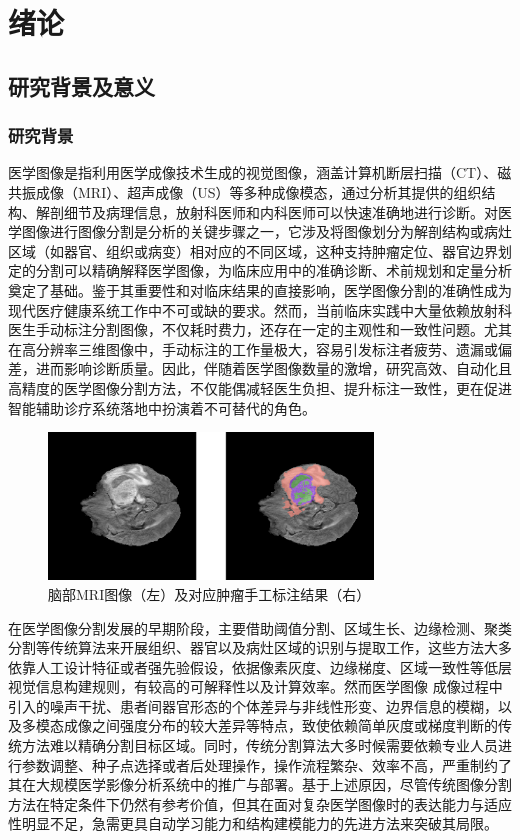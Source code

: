 \section{绪论}

\subsection{研究背景及意义}
\subsubsection{研究背景}

医学图像是指利用医学成像技术生成的视觉图像，涵盖计算机断层扫描（CT）、磁共振成像（MRI）、超声成像（US）等多种成像模态，通过分析其提供的组织结构、解剖细节及病理信息，放射科医师和内科医师可以快速准确地进行诊断。对医学图像进行图像分割是分析的关键步骤之一，它涉及将图像划分为解剖结构或病灶区域（如器官、组织或病变）相对应的不同区域，这种支持肿瘤定位、器官边界划定的分割可以精确解释医学图像，为临床应用中的准确诊断、术前规划和定量分析奠定了基础\cite{panayides2020}。鉴于其重要性和对临床结果的直接影响，医学图像分割的准确性成为现代医疗健康系统工作中不可或缺的要求。然而，当前临床实践中大量依赖放射科医生手动标注分割图像，不仅耗时费力，还存在一定的主观性和一致性问题。尤其在高分辨率三维图像中，手动标注的工作量极大，容易引发标注者疲劳、遗漏或偏差，进而影响诊断质量。因此，伴随着医学图像数量的激增，研究高效、自动化且高精度的医学图像分割方法，不仅能偶减轻医生负担、提升标注一致性，更在促进智能辅助诊疗系统落地中扮演着不可替代的角色。

\begin{figure}[h]
    \centering
    \includegraphics[width=0.77\textwidth]{fig/flair_and_mask.png}
    \caption{脑部MRI图像（左）及对应肿瘤手工标注结果（右）}
    \label{brian_tumor}
\end{figure}

在医学图像分割发展的早期阶段，主要借助阈值分割、区域生长、边缘检测、聚类分割等传统算法来开展组织、器官以及病灶区域的识别与提取工作，这些方法大多依靠人工设计特征或者强先验假设，依据像素灰度、边缘梯度、区域一致性等低层视觉信息构建规则，有较高的可解释性以及计算效率。然而医学图像 成像过程中引入的噪声干扰、患者间器官形态的个体差异与非线性形变、边界信息的模糊，以及多模态成像之间强度分布的较大差异等特点\cite{mohdsagheer2020}，致使依赖简单灰度或梯度判断的传统方法难以精确分割目标区域。同时，传统分割算法大多时候需要依赖专业人员进行参数调整、种子点选择或者后处理操作，操作流程繁杂、效率不高，严重制约了其在大规模医学影像分析系统中的推广与部署。基于上述原因，尽管传统图像分割方法在特定条件下仍然有参考价值，但其在面对复杂医学图像时的表达能力与适应性明显不足，急需更具自动学习能力和结构建模能力的先进方法来突破其局限。

